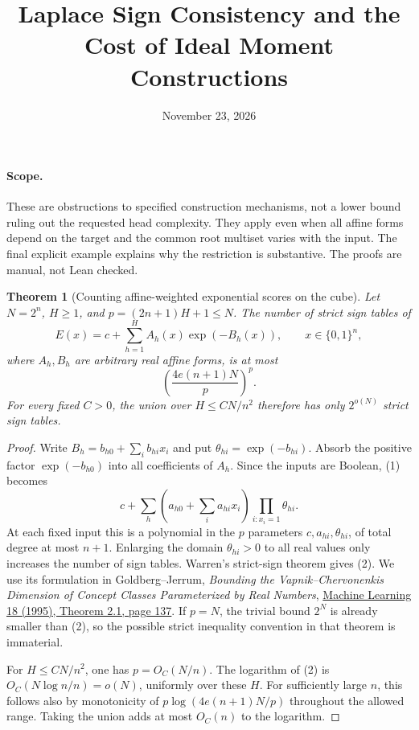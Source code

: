 \documentclass[11pt]{article}
\title{Laplace Sign Consistency and the Cost of Ideal Moment Constructions}
\author{}
\date{November 23, 2026}
\newtheorem{theorem}{Theorem}
\begin{document}
\maketitle

\paragraph{Scope.}
These are obstructions to specified construction mechanisms, not a
lower bound ruling out the requested head complexity. They apply even
when all affine forms depend on the target and the common root multiset
varies with the input. The final explicit example explains why the
restriction is substantive. The proofs are manual, not Lean checked.

\begin{theorem}[Counting affine-weighted exponential scores on the cube]
Let $N=2^n$, $H\ge1$, and $p=(2n+1)H+1\le N$. The number of
strict sign tables of
\[
 E(x)=c+\sum_{h=1}^H A_h(x)\exp(-B_h(x)),
 \qquad x\in\{0,1\}^n,
\tag{1}
\]
where $A_h,B_h$ are arbitrary real affine forms, is at most
\[
 \left(\frac{4e(n+1)N}{p}\right)^p.
\tag{2}
\]
For every fixed $C>0$, the union over $H\le C N/n^2$ therefore
has only $2^{o(N)}$ strict sign tables.
\end{theorem}
\begin{proof}
Write $B_h=b_{h0}+\sum_i b_{hi}x_i$ and put
$\theta_{hi}=\exp(-b_{hi})$. Absorb the positive factor
$\exp(-b_{h0})$ into all coefficients of $A_h$. Since the inputs
are Boolean, (1) becomes
\[
 c+\sum_h\left(a_{h0}+\sum_i a_{hi}x_i\right)
                         \prod_{i:x_i=1}\theta_{hi}.
\tag{3}
\]
At each fixed input this is a polynomial in the $p$ parameters
$c,a_{hi},\theta_{hi}$, of total degree at most $n+1$.
Enlarging the domain $\theta_{hi}>0$ to all real values only
increases the number of sign tables. Warren's strict-sign theorem
gives (2). We use its formulation in Goldberg--Jerrum,
\emph{Bounding the Vapnik--Chervonenkis Dimension of Concept Classes
Parameterized by Real Numbers},
\href{https://www.cs.ox.ac.uk/people/paul.goldberg/papers/GJ-ML95.pdf}
{Machine Learning 18 (1995), Theorem 2.1, page 137}.
If $p=N$, the trivial bound $2^N$ is already smaller than (2),
so the possible strict inequality convention in that theorem is immaterial.

For $H\le C N/n^2$, one has $p=O_C(N/n)$. The logarithm of
(2) is $O_C(N\log n/n)=o(N)$, uniformly over these $H$.
For sufficiently large $n$, this follows also by monotonicity of
$p\log(4e(n+1)N/p)$ throughout the allowed range. Taking the
union adds at most $O_C(n)$ to the logarithm.
\end{proof}
\end{document}
